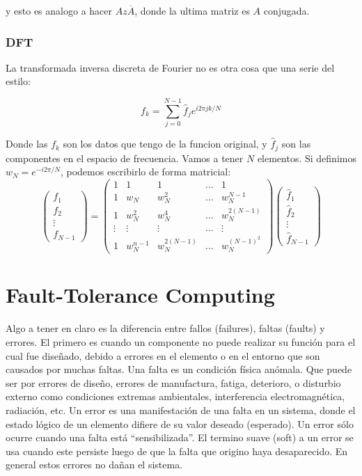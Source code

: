 \documentclass[12pt, oneside]{article}
\begin{document}
y esto es analogo a hacer $Az\overline{A}$, donde la ultima matriz es $A$ conjugada.


\subsubsection{DFT}
La transformada inversa discreta de Fourier no es otra cosa que una serie del estilo:

\begin{equation*}
    f_k = \sum_{j=0}^{N-1}\hat{f}_je^{i2\pi j k/N}
\end{equation*}

Donde las $f_k$ son los datos que tengo de la funcion original, y $\hat{f}_j$ son
las componentes en el espacio de frecuencia.
Vamos a tener $N$ elementos.
Si definimos $w_N=e^{-i2\pi/N}$, podemos escribirlo de forma matricial:
\begin{equation*}
    \begin{pmatrix}
         f_1 \\
         f_2 \\
        \vdots \\
          f_{N-1}
    \end{pmatrix}
    =
    \begin{pmatrix}
        1 & 1 &  1 & ... & 1 \\
        1 & w_N &  w_N^2 & ... & w_N^{N-1} \\
        1 & w_N^2 & w_N^4 & ... & w_N^{2(N-1)}\\
        \vdots & \vdots & \vdots & ... & \vdots\\
        1 & w_N^{n-1} & w_N^{2(N-1)} & ... & w_N^{(N-1)^2}
    \end{pmatrix}
    \label{eq:vandermonde}
    \begin{pmatrix}
        \hat{f}_1 \\
         \hat{f}_2 \\
        \vdots \\
          \hat{f}_{N-1}
    \end{pmatrix}
\end{equation*}


\section{Fault-Tolerance Computing}
Algo a tener en claro es la diferencia entre fallos (failures), faltas (faults) y errores.
El primero es cuando un componente no puede realizar su función para el cual fue diseñado, debido
a errores en el elemento o en el entorno que son causados por muchas faltas.
Una falta es un condición física anómala.
Que puede ser por errores de diseño, errores de manufactura, fatiga, deterioro, o disturbio externo como condiciones extremas
ambientales, interferencia electromagnética, radiación, etc.
Un error es una manifestación de una falta en un sistema, donde el estado lógico
de un elemento difiere  de su valor deseado (esperado).
Un error sólo ocurre cuando una falta está “sensibilizada”.
El termino suave (soft) a un error se usa cuando este persiste luego de que
la falta que origino haya desaparecido.
En general estos errores no dañan el sistema.
\end{document}
